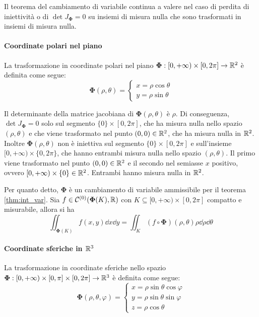 \begin{remark}
    Il teorema del cambiamento di variabile continua a valere nel caso di perdita di iniettività o di $\det J_{\bm\Phi}= 0$ su insiemi di misura nulla che sono trasformati in insiemi di misura nulla.
\end{remark}

\paragraph{Coordinate polari nel piano}
La trasformazione in coordinate polari nel piano $\bm\Phi:[0,+\infty)\times[0,2\pi]\to\mathbb{R}^2$ è definita come segue:
$$\bm\Phi(\rho,\theta)=
\begin{cases}
    x=\rho \cos \theta\\
    y=\rho \sin \theta
\end{cases}
$$

Il determinante della matrice jacobiana di $\bm\Phi(\rho,\theta)$ è $\rho$. Di conseguenza, $\det J_{\bm\Phi}=0$ solo sul segmento $\{0\}\times[0,2\pi]$, che ha misura nulla nello spazio $(\rho,\theta)$ e che viene trasformato nel punto $(0,0)\in\mathbb{R}^2$, che ha misura nulla in $\mathbb{R}^2$.
Inoltre $\bm\Phi(\rho,\theta)$ non è iniettiva sul segmento $\{0\}\times[0,2\pi]$ e sull'insieme $[0,+\infty)\times\{0,2\pi\}$, che hanno entrambi misura nulla nello spazio $(\rho,\theta)$. Il primo viene trasformato nel punto $(0,0)\in\mathbb{R}^2$ e il secondo nel semiasse $x$ positivo, ovvero $[0,+\infty)\times\{0\} \in \mathbb{R}^2$. Entrambi hanno misura nulla in $\mathbb{R}^2$.

Per quanto detto, $\bm\Phi$ è un cambiamento di variabile ammissibile per il teorema \ref{thm:int_var}. Sia $f\in \mathcal{C}^{(0)}(\bm\Phi(K),\mathbb{R})$ con $K\subseteq[0,+\infty)\times[0,2\pi]$ compatto e misurabile, allora si ha
$$\iint_{\bm\Phi(K)} f(x,y)\dd x \dd y=\iint_K (f\circ \bm\Phi)(\rho,\theta)\rho\dd \rho \dd \theta$$

\paragraph{Coordinate sferiche in $\mathbb{R}^3$}
La trasformazione in coordinate sferiche nello spazio $\bm\Phi:[0,+\infty)\times[0,\pi]\times[0,2\pi] \to \mathbb{R}^3$ è definita come segue:
$$
\bm\Phi(\rho,\theta,\varphi)=
\begin{cases}
    x=\rho\sin\theta\cos\varphi\\
    y=\rho\sin\theta\sin\varphi\\
    z=\rho\cos\theta
\end{cases}
$$

